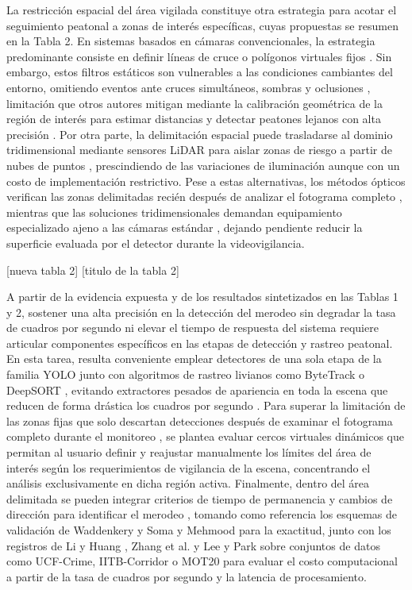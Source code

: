 \documentclass[runningheads]{llncs}
\begin{document}
La restricción espacial del área vigilada constituye otra estrategia para acotar el seguimiento peatonal a zonas de interés específicas, cuyas propuestas se resumen en la Tabla 2. En sistemas basados en cámaras convencionales, la estrategia predominante consiste en definir líneas de cruce o polígonos virtuales fijos \cite{fedosov2021,vu2026}. Sin embargo, estos filtros estáticos son vulnerables a las condiciones cambiantes del entorno, omitiendo eventos ante cruces simultáneos, sombras y oclusiones \cite{vu2026}, limitación que otros autores mitigan mediante la calibración geométrica de la región de interés para estimar distancias y detectar peatones lejanos con alta precisión \cite{lee2026}. Por otra parte, la delimitación espacial puede trasladarse al dominio tridimensional mediante sensores LiDAR para aislar zonas de riesgo a partir de nubes de puntos \cite{zhao2025}, prescindiendo de las variaciones de iluminación aunque con un costo de implementación restrictivo. Pese a estas alternativas, los métodos ópticos verifican las zonas delimitadas recién después de analizar el fotograma completo \cite{lee2026,fedosov2021,vu2026}, mientras que las soluciones tridimensionales demandan equipamiento especializado ajeno a las cámaras estándar \cite{zhao2025}, dejando pendiente reducir la superficie evaluada por el detector durante la videovigilancia.

[nueva tabla 2]
[titulo de la tabla 2]

A partir de la evidencia expuesta y de los resultados sintetizados en las Tablas 1 y 2, sostener una alta precisión en la detección del merodeo sin degradar la tasa de cuadros por segundo ni elevar el tiempo de respuesta del sistema requiere articular componentes específicos en las etapas de detección y rastreo peatonal. En esta tarea, resulta conveniente emplear detectores de una sola etapa de la familia YOLO junto con algoritmos de rastreo livianos como ByteTrack o DeepSORT \cite{lee2026,li2024,vu2026,zhang2023}, evitando extractores pesados de apariencia en toda la escena que reducen de forma drástica los cuadros por segundo \cite{li2024}. Para superar la limitación de las zonas fijas que solo descartan detecciones después de examinar el fotograma completo durante el monitoreo \cite{lee2026,fedosov2021,vu2026}, se plantea evaluar cercos virtuales dinámicos que permitan al usuario definir y reajustar manualmente los límites del área de interés según los requerimientos de vigilancia de la escena, concentrando el análisis exclusivamente en dicha región activa. Finalmente, dentro del área delimitada se pueden integrar criterios de tiempo de permanencia y cambios de dirección para identificar el merodeo \cite{jiang2022,li2024,m2022,zhang2023}, tomando como referencia los esquemas de validación de Waddenkery y Soma \cite{waddenkery2024} y Mehmood \cite{mehmood2021} para la exactitud, junto con los registros de Li y Huang \cite{li2024}, Zhang et al. \cite{zhang2023} y Lee y Park \cite{lee2026} sobre conjuntos de datos como UCF-Crime, IITB-Corridor o MOT20 para evaluar el costo computacional a partir de la tasa de cuadros por segundo y la latencia de procesamiento.
\end{document}
